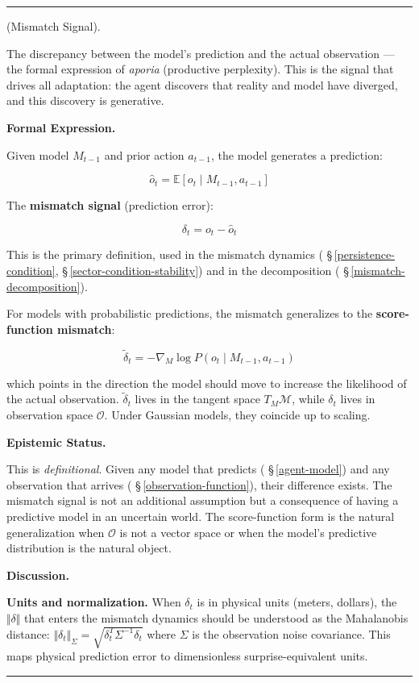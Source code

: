 \documentclass[11pt,oneside]{article}
\newcounter{claim}[section]
\renewcommand{\theclaim}{\thesection.\arabic{claim}}
\newenvironment{segment}[2]{%
  \refstepcounter{claim}%
  \bigskip\noindent\hrule\smallskip
  \noindent{\bfseries #1~\theclaim}\enskip(#2).\par\smallskip
  \noindent\ignorespaces
}{%
  \par\smallskip\noindent\hrule\bigskip
}
\newenvironment{definition}[1][]{\begin{segment}{Definition}{#1}}{\end{segment}}
\begin{document}
\begin{definition}[Mismatch Signal]
\label{mismatch-signal}
The discrepancy between the model's prediction and the actual observation — the formal expression of \textit{aporia} (productive perplexity). This is the signal that drives all adaptation: the agent discovers that reality and model have diverged, and this discovery is generative.



\medskip\noindent\textbf{Formal Expression.}



Given model $M_{t-1}$ and prior action $a_{t-1}$, the model generates a prediction:

$$\hat{o}_t = \mathbb{E}[o_t \mid M_{t-1}, a_{t-1}]$$

The \textbf{mismatch signal} (prediction error):

$$\delta_t = o_t - \hat{o}_t$$

This is the primary definition, used in the mismatch dynamics ( \S\,\ref{persistence-condition}, \S\,\ref{sector-condition-stability}) and in the decomposition ( \S\,\ref{mismatch-decomposition}).

For models with probabilistic predictions, the mismatch generalizes to the \textbf{score-function mismatch}:


$$\tilde{\delta}_t = -\nabla_M \log P(o_t \mid M_{t-1}, a_{t-1})$$

which points in the direction the model should move to increase the likelihood of the actual observation. $\tilde{\delta}_t$ lives in the tangent space $T_M\mathcal{M}$, while $\delta_t$ lives in observation space $\mathcal{O}$. Under Gaussian models, they coincide up to scaling.


\medskip\noindent\textbf{Epistemic Status.}


This is \textit{definitional}. Given any model that predicts ( \S\,\ref{agent-model}) and any observation that arrives ( \S\,\ref{observation-function}), their difference exists. The mismatch signal is not an additional assumption but a consequence of having a predictive model in an uncertain world. The score-function form is the natural generalization when $\mathcal{O}$ is not a vector space or when the model's predictive distribution is the natural object.


\medskip\noindent\textbf{Discussion.}


\textbf{Units and normalization.} When $\delta_t$ is in physical units (meters, dollars), the $\Vert\delta\Vert$ that enters the mismatch dynamics should be understood as the Mahalanobis distance: $\Vert\delta_t\Vert_\Sigma = \sqrt{\delta_t^T \Sigma^{-1} \delta_t}$ where $\Sigma$ is the observation noise covariance. This maps physical prediction error to dimensionless surprise-equivalent units.


\end{definition}
\end{document}
